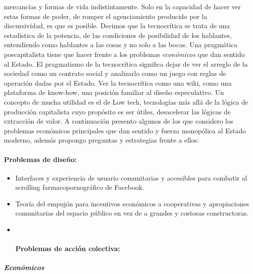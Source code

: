 \documentclass[
]{article}
\let\oldparagraph\paragraph
\renewcommand{\paragraph}[1]{\oldparagraph{#1}\mbox{}}
\let\oldsubparagraph\subparagraph
\renewcommand{\subparagraph}[1]{\oldsubparagraph{#1}\mbox{}}
\begin{document}
mercancías y formas de vida indistintamente. Solo en la capacidad de
hacer ver estas formas de poder, de romper el agenciamiento producido
por la discursividad, es que es posible. Decimos que la tecnocrítica se
trata de una estadística de la potencia, de las condiciones de
posibilidad de los hablantes, entendiendo como hablantes a las cosas y
no solo a las bocas. Una pragmática poscapitalista tiene que hacer
frente a los problemas \emph{económicos} que dan sentido al Estado. El
pragmatismo de la tecnocrítica significa dejar de ver el arreglo de la
sociedad como un contrato social y analizarlo como un juego con reglas
de operación dadas por el Estado. Ver la tecnocrítica como una wiki,
como una plataforma de know-how, una posición familiar al diseño
especulativo. Un concepto de mucha utilidad es el de Low tech,
tecnologías más allá de la lógica de producción capitalista cuyo
propósito es ser útiles, desacelerar las lógicas de extracción de valor.
A continuación presento algunos de los que considero los problemas
económicos principales que dan sentido y fuerza monopólica al Estado
moderno, además propongo preguntas y estrategias frente a ellos:

\hypertarget{problemas-de-diseuxf1o}{%
\paragraph{Problemas de diseño:}\label{problemas-de-diseuxf1o}}

\begin{itemize}
\item
  Interfaces y experiencia de usuario comunitarias y accesibles para
  combatir al scrolling farmacopornográfico de Facebook.
\item
  Teoría del empujón para incentivos económicos a cooperativas y
  apropiaciones comunitarias del espacio público en vez de a grandes y
  costosas constructoras.
\item ~
  \hypertarget{problemas-de-acciuxf3n-colectiva}{%
  \paragraph{Problemas de acción
  colectiva:}\label{problemas-de-acciuxf3n-colectiva}}
\end{itemize}

\hypertarget{econuxf3micos}{%
\subparagraph{Económicos}\label{econuxf3micos}}
\end{document}
